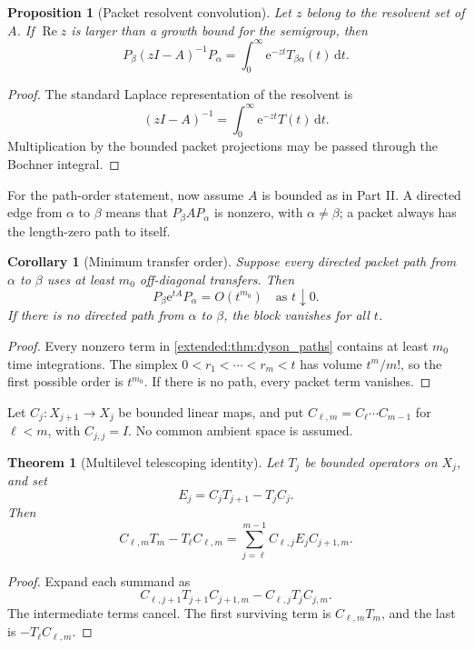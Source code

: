 \documentclass[11pt,letterpaper]{article}
\newtheorem{theorem}{Theorem}[section]
\theoremstyle{plain}
\newtheorem{proposition}[proposition]{Proposition}
\theoremstyle{plain}
\theoremstyle{plain}
\newtheorem{corollary}[corollary]{Corollary}
\theoremstyle{definition}
\theoremstyle{definition}
\theoremstyle{definition}
\theoremstyle{definition}
\theoremstyle{definition}
\theoremstyle{remark}
\theoremstyle{remark}
\theoremstyle{remark}
\theoremstyle{remark}
\theoremstyle{remark}
\theoremstyle{remark}
\newcommand{\e}{\mathrm e}
\newcommand{\dd}{\,\mathrm d}
\let\KomorebiPrimitivemathrm\mathrm
\renewcommand{\mathrm}[1]{{\KomorebiPrimitivemathrm{#1}}}
\begin{document}
\begin{proposition}[Packet resolvent convolution]\label{earlier:record:002}\label{earlier:prop:packet_resolvent}
Let \(z\) belong to the resolvent set of \(A\). If \(\operatorname{Re}z\) is larger than a growth bound for the semigroup, then
\[
P_\beta(zI-A)^{-1}P_\alpha
=
\int_0^{\infty}\e^{-zt}T_{\beta\alpha}(t)\dd t.
\]
\end{proposition}

\begin{proof}
The standard Laplace representation of the resolvent is
\[
(zI-A)^{-1}
=
\int_0^{\infty}\e^{-zt}T(t)\dd t.
\]
Multiplication by the bounded packet projections may be passed through the Bochner integral.
\end{proof}


For the path-order statement, now assume $A$ is bounded as in Part II. A directed edge from $\alpha$ to $\beta$ means that $P_\beta A P_\alpha$ is nonzero, with $\alpha\ne\beta$; a packet always has the length-zero path to itself.
\begin{corollary}[Minimum transfer order]\label{earlier:record:003}\label{earlier:cor:minimum_transfer_order}
Suppose every directed packet path from \(\alpha\) to \(\beta\) uses at least \(m_0\) off-diagonal transfers. Then
\[
P_\beta\e^{tA}P_\alpha
=O(t^{m_0})
\quad\text{as }t\downarrow0.
\]
If there is no directed path from \(\alpha\) to \(\beta\), the block vanishes for all \(t\).
\end{corollary}

\begin{proof}
Every nonzero term in \cref{extended:thm:dyson_paths} contains at least \(m_0\) time integrations. The simplex \(0<r_1<\cdots<r_m<t\) has volume \(t^m/m!\), so the first possible order is \(t^{m_0}\). If there is no path, every packet term vanishes.
\end{proof}


Let $C_j:X_{j+1}\to X_j$ be bounded linear maps, and put $C_{\ell,m}=C_\ell\cdots C_{m-1}$ for $\ell<m$, with $C_{j,j}=I$. No common ambient space is assumed.
\begin{theorem}[Multilevel telescoping identity]\label{earlier:record:004}\label{earlier:thm:multilevel_telescoping}
Let \(T_j\) be bounded operators on \(X_j\), and set
\[
E_j=C_jT_{j+1}-T_jC_j.
\]
Then
\[
\boxed{
C_{\ell,m}T_m-T_\ell C_{\ell,m}
=
\sum_{j=\ell}^{m-1}
C_{\ell,j}E_jC_{j+1,m}.
}
\]
\end{theorem}

\begin{proof}
Expand each summand as
\[
C_{\ell,j+1}T_{j+1}C_{j+1,m}
-
C_{\ell,j}T_jC_{j,m}.
\]
The intermediate terms cancel. The first surviving term is \(C_{\ell,m}T_m\), and the last is \(-T_\ell C_{\ell,m}\).
\end{proof}
\end{document}
